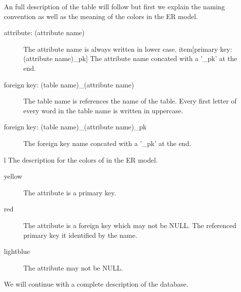     An full description of the table will follow but first we explain the naming convention as well as the meaning of the colors in the ER model.

    \begin{description}
        \item[attribute: (attribute name)] The attribute name is always written in lower case.
        item[primary key: (attribute name)\_pk] The attribute name concated with a '\_pk' at the end.
        \item[foreign key: (table name)\_(attribute name)] The table name is references the name of the table. Every first letter of every word in the table name is written in uppercase.
         \item[foreign key: (table name)\_(attribute name)\_pk] The foreign key name concated with a '\_pk' at the end.
    \end{description}
l
    The description for the colors of in the ER model.

    \begin{description}
        \item[yellow] The attribute is a primary key.
        \item[red] The attribute is a foreign key which may not be NULL. The referenced primary key it identified by the name. 
        \item[lightblue] The attribute may not be NULL.
    \end{description}

    We will continue with a complete description of the database.

